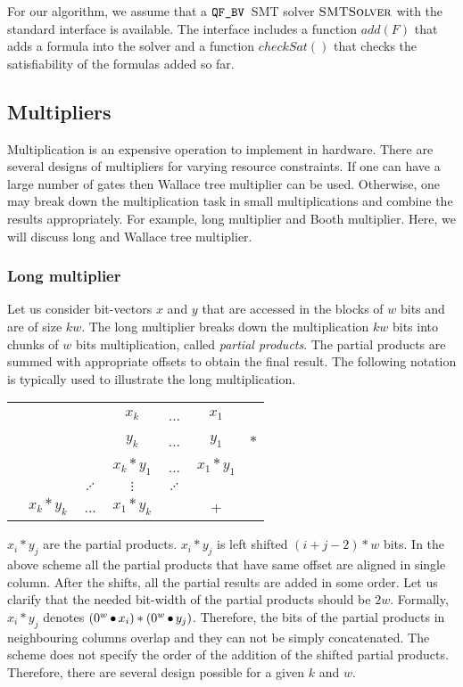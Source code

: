 For our algorithm, we assume that a  $\texttt{QF\_BV}$~SMT
solver $\textsc{SMTSolver}$ 
with the standard interface is available.
%
The interface includes a function $add(F)$ that adds a formula
into the solver and a function $checkSat()$ that checks the
satisfiability of the formulas added so far. 

\subsection{Multipliers}

Multiplication is an expensive operation to implement in hardware.
%
There are several designs of multipliers for varying
resource constraints.
%
If one can have a large number of gates then Wallace tree
multiplier can be used.
%
Otherwise, one may break down the multiplication task in
small multiplications and combine the results appropriately.
%
For example, long multiplier and Booth multiplier.
%
Here, we will discuss long and Wallace tree multiplier.

\subsubsection{Long multiplier}

Let us consider bit-vectors $x$ and $y$ that are accessed in the blocks of $w$
bits and are of size $kw$.
%
The long multiplier breaks down the multiplication $kw$ bits
into chunks of $w$ bits multiplication, called {\em partial products}.
%
The partial products are summed with appropriate offsets to obtain
the final result.
%
The following notation is typically used to illustrate
the long multiplication.
%
\begin{center}
\begin{tabular}{c@{\quad}c@{\quad}c@{\quad}c@{\quad}c@{\quad}c@{\quad}c}
  &&& $x_{k}$ & ... & $x_1$&\\ 
  &&& $y_{k}$ & ... & $y_1$&$*$\\ \hline
  &&&$x_k*y_1$& ... & $x_1*y_1$&\\
  &&$\iddots$&$\vdots$& $\iddots$ && \\
  &$x_k*y_k$& ... &$x_1*y_k$&  & +&\\\hline
\end{tabular}  
\end{center}
$x_i * y_j$ are the partial products.
%
$x_i*y_j$ is left shifted $(i+j-2)*w$ bits. 
%
In the above scheme all the partial products that have same offset are 
aligned in single column.
%
After the shifts, all the partial results are added in some order.
%
Let us clarify that the needed bit-width of the partial products should be $2w$.
%
Formally, $x_i * y_j$ denotes $(0^w \mathop{\bullet} x_i)*(0^w \mathop{\bullet} y_j)$.
%
Therefore, the bits of the partial products in neighbouring columns overlap
and they can not be simply concatenated.
%
The scheme does not specify the order of the addition
of the shifted partial products.
%
Therefore, there are several design possible for a given $k$ and $w$.

